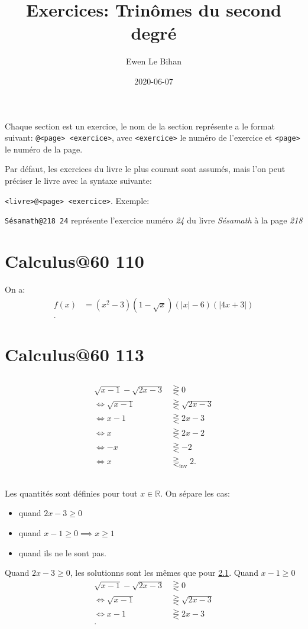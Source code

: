 \documentclass{article}
\title{Exercices: Trinômes du second degré}
\author{Ewen Le Bihan}
\date{2020-06-07}
\newcommand{\R}{\mathbb{R}}
\begin{document}
\maketitle

\abstract{}
Chaque section est un exercice, le nom de la section représente a le format suivant:
\texttt{@<page> <exercice>}, avec \texttt{<exercice>} le numéro de l'exercice et \texttt{<page>} le numéro de la page.

Par défaut, les exercices du livre le plus courant sont assumés, mais l'on peut préciser le livre avec la syntaxe suivante:

\texttt{<livre>@<page> <exercice>}.
Exemple:

\texttt{Sésamath@218 24} représente l'exercice numéro \emph{24} du livre \emph{Sésamath} à la page \emph{218}

\section{Calculus@60 110}

On a:
\begin{align*}
	f(x) &= (x^2-3)(1-\sqrt{x} )(|x|-6)(|4x+3|) \\
.\end{align*}



\section{Calculus@60 113}
\subsection{} \label{113 a)}
\begin{align*}
	\sqrt{x-1} -\sqrt{2x-3} &\gtreqless 0 \\
	\iff \sqrt{x-1} &\gtreqless \sqrt{2x-3} \\
	\iff x-1 &\gtreqless 2x-3 \\
	\iff x &\gtreqless 2x-2 \\
	\iff -x &\gtreqless -2 \\
	\iff x &\gtreqless_\text{inv} 2
.\end{align*}
\subsection{}
Les quantités sont définies pour tout $x \in \R$.
On sépare les cas:
\begin{itemize}
	\item quand $2x-3 \ge  0$
	\item quand $x-1 \ge  0 \implies x \ge  1$ 
	\item quand ils ne le sont pas.
\end{itemize}
Quand $2x-3\ge 0$, les solutionns sont les mêmes que pour \ref{113 a)}.
Quand $x-1\ge 0$
\begin{align*}
	\sqrt{x-1} -\sqrt{2x-3} &\gtreqless 0 \\
	\iff \sqrt{x-1} &\gtreqless \sqrt{2x-3} \\
	\iff x-1 &\gtreqless 2x-3 \\
.\end{align*}
\end{document}
